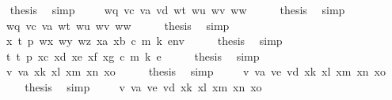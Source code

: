 \begin{isabellebody}
\ \isamarkupfalse%
\ {\isacharquery}{\kern0pt}thesis\ \isamarkupfalse%
\ simp\isanewline
{}\isamarkupfalse%
\isanewline
\ \ \isamarkupfalse%
\ {\isacharparenleft}{\kern0pt}{}{}\ wq\ vc\ va\ vd\ wt\ wu\ wv\ ww{\isacharparenright}{\kern0pt}\isanewline
\ \ \isamarkupfalse%
\ \isamarkupfalse%
\ {\isacharquery}{\kern0pt}thesis\ \isamarkupfalse%
\ simp\isanewline
{}\isamarkupfalse%
\isanewline
\ \ \isamarkupfalse%
\ {\isacharparenleft}{\kern0pt}{}{}\ wq\ vc\ va\ wt\ wu\ wv\ ww{\isacharparenright}{\kern0pt}\isanewline
\ \ \isamarkupfalse%
\ \isamarkupfalse%
\ {\isacharquery}{\kern0pt}thesis\ \isamarkupfalse%
\ simp\isanewline
{}\isamarkupfalse%
\isanewline
\ \ \isamarkupfalse%
\ {\isacharparenleft}{\kern0pt}{}{}\ x\ t\ p\ wx\ wy\ wz\ xa\ xb\ c\ m\ k\ env{\isacharparenright}{\kern0pt}\isanewline
\ \ \isamarkupfalse%
\ \isamarkupfalse%
\ {\isacharquery}{\kern0pt}thesis\ \isamarkupfalse%
\ simp\isanewline
{}\isamarkupfalse%
\isanewline
\ \ \isamarkupfalse%
\ {\isacharparenleft}{\kern0pt}{}{}\ t\ t{\isacharprime}{\kern0pt}\ p\ xc\ xd\ xe\ xf\ xg\ c\ m\ k\ e{\isacharparenright}{\kern0pt}\isanewline
\ \ \isamarkupfalse%
\ \isamarkupfalse%
\ {\isacharquery}{\kern0pt}thesis\ \isamarkupfalse%
\ simp\isanewline
{}\isamarkupfalse%
\isanewline
\ \ \isamarkupfalse%
\ {\isacharparenleft}{\kern0pt}{}{}\ v\ va\ xk\ xl\ xm\ xn\ xo{\isacharparenright}{\kern0pt}\isanewline
\ \ \isamarkupfalse%
\ \isamarkupfalse%
\ {\isacharquery}{\kern0pt}thesis\ \isamarkupfalse%
\ simp\isanewline
{}\isamarkupfalse%
\isanewline
\ \ \isamarkupfalse%
\ {\isacharparenleft}{\kern0pt}{}{}\ v\ va\ ve\ vd\ xk\ xl\ xm\ xn\ xo{\isacharparenright}{\kern0pt}\isanewline
\ \ \isamarkupfalse%
\ \isamarkupfalse%
\ {\isacharquery}{\kern0pt}thesis\ \isamarkupfalse%
\ simp\isanewline
{}\isamarkupfalse%
\isanewline
\ \ \isamarkupfalse%
\ {\isacharparenleft}{\kern0pt}{}{}\ v\ va\ ve\ vd\ xk\ xl\ xm\ xn\ xo{\isacharparenright}{\kern0pt}\isanewline

\end{isabellebody}
